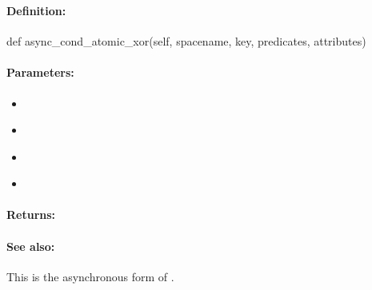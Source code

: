 \pagebreak
\subsubsection{}
\label{api:python:async_cond_atomic_xor}


\paragraph{Definition:}
\begin{pythoncode}
def async_cond_atomic_xor(self, spacename, key, predicates, attributes)
\end{pythoncode}

\paragraph{Parameters:}
\begin{itemize}[noitemsep]
\item {}\\

\item {}\\

\item {}\\

\item {}\\

\end{itemize}

\paragraph{Returns:}


\paragraph{See also:}  This is the asynchronous form of .

\pagebreak
\subsubsection{}
\label{api:python:atomic_min}


